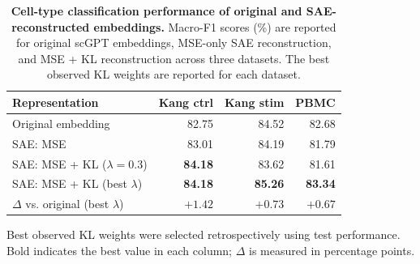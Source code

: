 \begin{table}[!htbp]
  \caption{\textbf{Cell-type classification performance of original and SAE-reconstructed embeddings.} Macro-F1 scores (\%) are reported for original scGPT embeddings, MSE-only SAE reconstruction, and MSE + KL reconstruction across three datasets. The best observed KL weights are reported for each dataset.}
  \label{tab:classification}
  \centering
  \small
  \setlength{\tabcolsep}{5pt}
  \renewcommand{\arraystretch}{1.15}
  \begin{tabular*}{\linewidth}{@{\extracolsep{\fill}}lrrr@{}}
    \toprule
    Representation & Kang ctrl & Kang stim & PBMC \\
    \midrule
    Original embedding & 82.75 & 84.52 & 82.68 \\
    SAE: MSE & 83.01 & 84.19 & 81.79 \\
    SAE: MSE + KL ($\lambda=0.3$) & \textbf{84.18} & 83.62 & 81.61 \\
    SAE: MSE + KL (best $\lambda$) & \textbf{84.18} & \textbf{85.26} & \textbf{83.34} \\
    \midrule
    $\Delta$ vs. original (best $\lambda$) & $+1.42$ & $+0.73$ & $+0.67$ \\
    \bottomrule
  \end{tabular*}
  \par\vspace{3pt}
  \begin{minipage}{\linewidth}
    \footnotesize
    Best observed KL weights were selected retrospectively using test performance. Bold indicates the best value in each column; $\Delta$ is measured in percentage points.
  \end{minipage}
\end{table}

